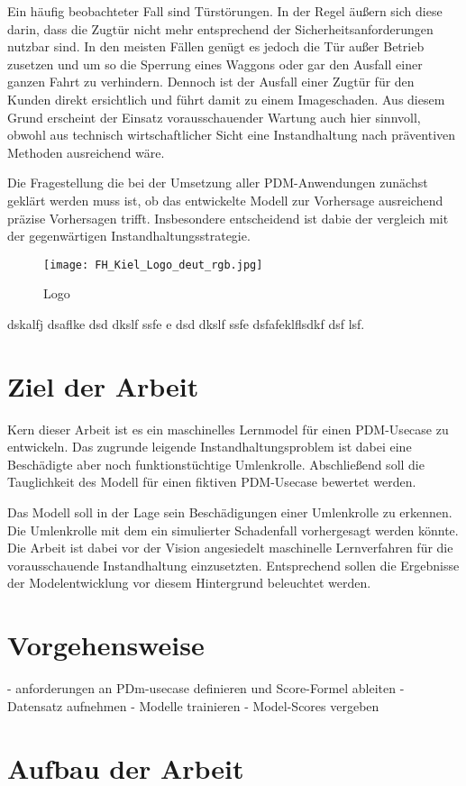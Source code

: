 Ein häufig beobachteter Fall sind Türstörungen. In der Regel äußern sich diese darin, dass die Zugtür nicht mehr entsprechend der Sicherheitsanforderungen nutzbar sind. In den meisten Fällen genügt es jedoch die Tür außer Betrieb zusetzen und um so die Sperrung eines Waggons oder gar den Ausfall einer ganzen Fahrt zu verhindern. Dennoch ist der Ausfall einer Zugtür für den Kunden direkt ersichtlich und führt damit zu einem Imageschaden. Aus diesem Grund erscheint der Einsatz vorausschauender Wartung auch hier sinnvoll, obwohl aus technisch wirtschaftlicher Sicht eine Instandhaltung nach präventiven Methoden ausreichend wäre. 

Die Fragestellung die bei der Umsetzung aller PDM-Anwendungen zunächst geklärt werden muss ist, ob das entwickelte Modell zur Vorhersage ausreichend präzise Vorhersagen trifft. Insbesondere entscheidend ist dabie der vergleich mit der gegenwärtigen Instandhaltungsstrategie.

\begin{figure}[ht]
	\centering
	\texttt{[image: FH\_Kiel\_Logo\_deut\_rgb.jpg]}
	\caption{Logo}
	\label{fig:fhlogo}
\end{figure}

dskalfj dsaflke dsd dkslf ssfe e dsd dkslf ssfe dsfafeklflsdkf dsf lsf. \cite{gasparovic1969}
\section{Ziel der Arbeit}
\label{sec:ziel}
Kern dieser Arbeit ist es ein maschinelles Lernmodel für einen PDM-Usecase zu entwickeln. Das zugrunde leigende Instandhaltungsproblem ist dabei eine Beschädigte aber noch funktionstüchtige Umlenkrolle. Abschließend soll die Tauglichkeit des Modell für einen fiktiven PDM-Usecase bewertet werden. 



Das Modell soll in der Lage sein Beschädigungen einer Umlenkrolle zu erkennen. Die Umlenkrolle mit dem ein simulierter Schadenfall vorhergesagt werden könnte. Die Arbeit ist dabei vor der Vision angesiedelt maschinelle Lernverfahren für die vorausschauende Instandhaltung einzusetzten. Entsprechend sollen die Ergebnisse der Modelentwicklung vor diesem Hintergrund beleuchtet werden.

\section{Vorgehensweise}
\label{sec:vorgehensweise}
- anforderungen an PDm-usecase definieren und Score-Formel ableiten
- Datensatz aufnehmen
- Modelle trainieren
- Model-Scores vergeben 

\section{Aufbau der Arbeit}
\label{sec:gliederung}

\blindtext[2]

\blindtext[3]

\blindtext[5]

\blindtext[3]